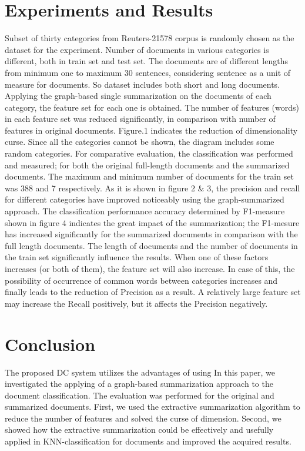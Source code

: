 \documentclass{sigchi}
\begin{document}
\section{Experiments and Results}\label{sectionExperiments}
Subset of thirty categories from Reuters-21578 corpus is randomly chosen as the dataset for the experiment. 
Number of documents in various categories is different, both in train set and test set. The documents are of different lengths from minimum one to maximum 30 sentences, considering sentence as a unit of measure for documents. So dataset includes both short and long documents.
Applying the graph-based single summarization on the documents of each category, the feature set for each one is obtained. 
The number of features (words) in each feature set was reduced significantly, in comparison with number of features in original documents. 
Figure.1 indicates the reduction of dimensionality curse. 
Since all the categories cannot be shown, the diagram includes some random categories.
For comparative evaluation, the classification was performed and measured; 
for both the original full-length documents and the summarized documents. 
The maximum and minimum number of documents for the train set was 388 and 7 respectively. As it is shown in figure 2 \& 3, the precision and recall for different categories have improved noticeably using the graph-summarized approach. 
The classification performance accuracy determined by F1-measure shown in figure 4 indicates the great impact of the summarization; 
the F1-mesure has increased significantly for the summarized documents in comparison with the full length documents.
The length of documents and the number of documents in the train set significantly influence the results. 
When one of these factors increases (or both of them), the feature set will also increase. 
In case of this, the possibility of occurrence of common words between categories increases and finally leads to the reduction of Precision as a result. 
A relatively large feature set may increase the Recall positively, but it affects the Precision negatively.

\section{Conclusion}\label{sectionConclusion}
The proposed DC system utilizes the advantages of using
In this paper, we investigated the applying of a graph-based summarization approach to the document classification. 
The evaluation was performed for the original and summarized documents. 
First, we used the extractive summarization algorithm to reduce the number of features and solved the curse of dimension. 
Second, we showed how the extractive summarization could be effectively and usefully applied in KNN-classification for documents and improved the acquired results.
\end{document}
